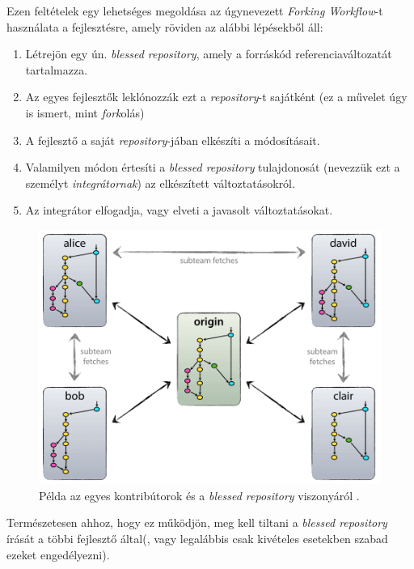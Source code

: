 Ezen feltételek egy lehetséges megoldása az úgynevezett \emph{Forking Workflow}-t használata
a fejlesztésre, amely röviden az alábbi lépésekből áll:
\begin{enumerate}
    \item{Létrejön egy ún. \emph{blessed repository}, amely a forráskód referenciaváltozatát
        tartalmazza.}
    \item{Az egyes fejlesztők leklónozzák ezt a \emph{repository}-t sajátként (ez a művelet úgy is
        ismert, mint \emph{fork}olás)}
    \item{A fejlesztő a saját \emph{repository}-jában elkészíti a módosításait.}
    \item{Valamilyen módon értesíti a \emph{blessed repository} tulajdonosát
        (nevezzük ezt a személyt \emph{integrátornak}) az elkészített változtatásokról.}
    \item{Az integrátor elfogadja, vagy elveti a javasolt változtatásokat.}
\end{enumerate}

\begin{figure}[h]
    \centering
    \includegraphics[width=\textwidth, height=0.25\textheight, keepaspectratio]{figures/forkingworkflow.png}
    \caption{Példa az egyes kontribútorok és a \emph{blessed repository} viszonyáról \cite{ForkingWorkflow}.}
\end{figure}
\FloatBarrier

Természetesen ahhoz, hogy ez működjön, meg kell tiltani a \emph{blessed repository} írását a többi
fejlesztő által(, vagy legalábbis csak kivételes esetekben szabad ezeket engedélyezni).

